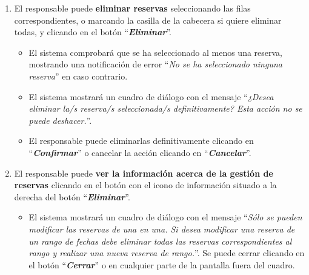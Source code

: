 \begin{enumerate}
        \item El responsable puede \textbf{eliminar reservas} seleccionando las filas correspondientes, o marcando la casilla de la cabecera si quiere eliminar todas, y clicando en el botón ``\textbf{\textit{Eliminar}}''.
        
            \begin{itemize}
            \tightlist
                \item El sistema comprobará que se ha seleccionado al menos una reserva, mostrando una notificación de error ``\textit{No se ha seleccionado ninguna reserva}'' en caso contrario.
                
                \item El sistema mostrará un cuadro de diálogo con el mensaje ``\textit{¿Desea eliminar la/s reserva/s seleccionada/s definitivamente? Esta acción no se puede deshacer.}''.
                
                \item El responsable puede eliminarlas definitivamente clicando en ``\textbf{\textit{Confirmar}}'' o cancelar la acción clicando en ``\textbf{\textit{Cancelar}}''.
            \end{itemize}
            
        \item El responsable puede \textbf{ver la información acerca de la gestión de reservas} clicando en el botón con el icono de información situado a la derecha del botón ``\textbf{\textit{Eliminar}}''.
        
            \begin{itemize}
            \tightlist
                \item El sistema mostrará un cuadro de diálogo con el mensaje ``\textit{Sólo se pueden modificar las reservas de una en una. Si desea modificar una reserva de un rango de fechas debe eliminar todas las reservas correspondientes al rango y realizar una nueva reserva de rango.}''. Se puede cerrar clicando en el botón ``\textbf{\textit{Cerrar}}'' o en cualquier parte de la pantalla fuera del cuadro.
            \end{itemize}
    \end{enumerate}

